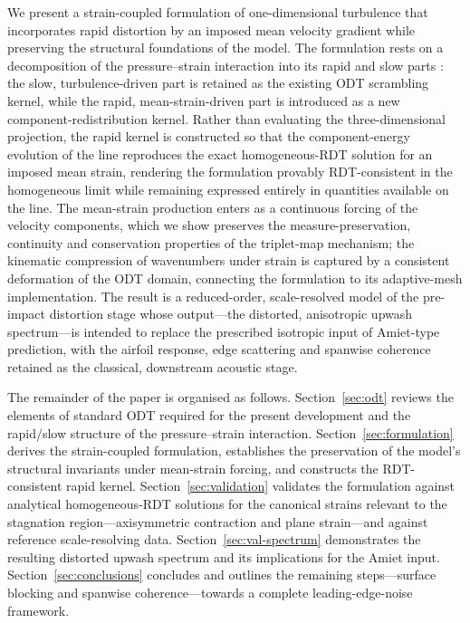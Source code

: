 \documentclass[lineno]{JFM-FLM_Au}
\begin{document}
We present a strain-coupled formulation of one-dimensional turbulence that
incorporates rapid distortion by an imposed mean velocity gradient while
preserving the structural foundations of the model. The formulation rests
on a decomposition of the pressure--strain interaction into its rapid and
slow parts \citep{Pope2000}: the slow, turbulence-driven part is retained
as the existing ODT scrambling kernel, while the rapid, mean-strain-driven
part is introduced as a new component-redistribution kernel. Rather than
evaluating the three-dimensional projection, the rapid kernel is
constructed so that the component-energy evolution of the line reproduces
the exact homogeneous-RDT solution for an imposed mean strain, rendering
the formulation provably RDT-consistent in the homogeneous limit while
remaining expressed entirely in quantities available on the line. The
mean-strain production enters as a continuous forcing of the velocity
components, which we show preserves the measure-preservation, continuity
and conservation properties of the triplet-map mechanism; the kinematic
compression of wavenumbers under strain is captured by a consistent
deformation of the ODT domain, connecting the formulation to its
adaptive-mesh implementation. The result is a reduced-order, scale-resolved
model of the pre-impact distortion stage whose output---the distorted,
anisotropic upwash spectrum---is intended to replace the prescribed
isotropic input of Amiet-type prediction, with the airfoil response, edge
scattering and spanwise coherence retained as the classical, downstream
acoustic stage.

The remainder of the paper is organised as follows.
Section~\ref{sec:odt} reviews the elements of standard ODT required for the
present development and the rapid/slow structure of the pressure--strain
interaction. Section~\ref{sec:formulation} derives the strain-coupled
formulation, establishes the preservation of the model's structural
invariants under mean-strain forcing, and constructs the RDT-consistent
rapid kernel. Section~\ref{sec:validation} validates the formulation
against analytical homogeneous-RDT solutions for the canonical strains
relevant to the stagnation region---axisymmetric contraction and plane
strain---and against reference scale-resolving data. Section~\ref{sec:val-spectrum} demonstrates the resulting distorted upwash spectrum and its implications for the Amiet input. Section~\ref{sec:conclusions} concludes and outlines
the remaining steps---surface blocking and spanwise coherence---towards a
complete leading-edge-noise framework.
\end{document}

